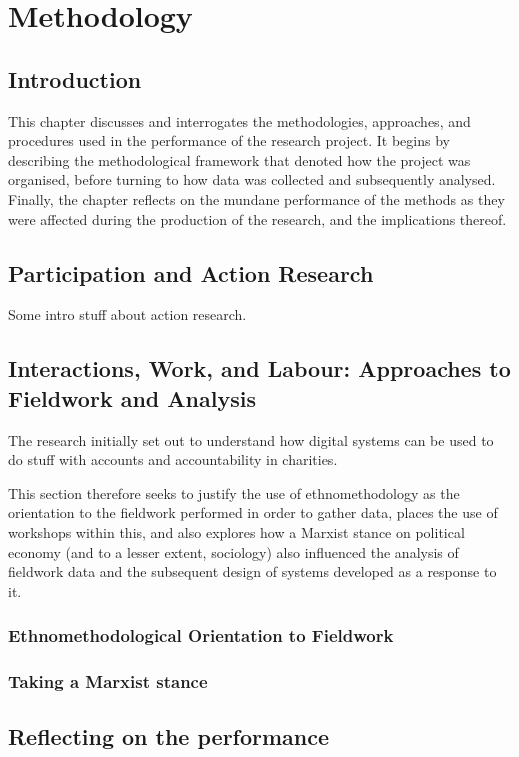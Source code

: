 \chapter{Methodology}
\label{sec:method}

\section{Introduction}
This chapter discusses and interrogates the methodologies, approaches, and procedures used in the performance of the research project. It begins by describing the methodological framework that denoted how the project was organised, before turning to how data was collected and subsequently analysed. Finally, the chapter reflects on the mundane performance of the methods as they were affected during the production of the research, and the implications thereof.



\section{Participation and Action Research}
\label{sec:method:approach}

Some intro stuff about action research.


\section{Interactions, Work, and Labour: Approaches to Fieldwork and Analysis}
\label{sec:method:fieldwork}

The research initially set out to understand how digital systems can be used to do stuff with accounts and accountability in charities. 

This section therefore seeks to justify the use of ethnomethodology as the orientation to the fieldwork performed in order to gather data, places the use of workshops within this, and also explores how a Marxist stance on political economy (and to a lesser extent, sociology) also influenced the analysis of fieldwork data and the subsequent design of systems developed as a response to it.


\subsection{Ethnomethodological Orientation to Fieldwork}


\subsection{Taking a Marxist stance}

\section{Reflecting on the performance}

